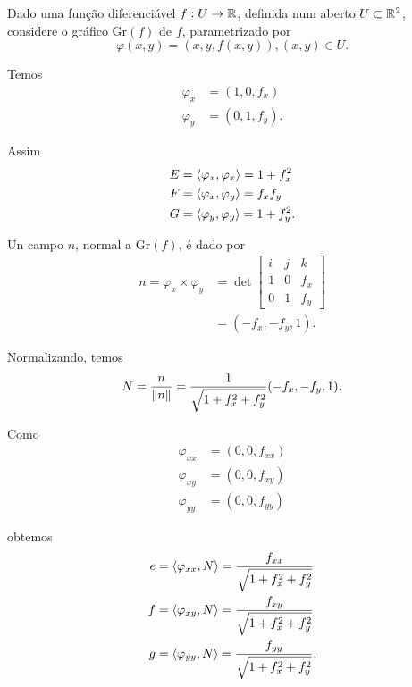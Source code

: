 \begin{exemplo}
	Dado uma função diferenciável $f: U \rightarrow \mathbb{R}$, definida num aberto $U \subset \mathbb{R}^2$, considere o gráfico $\text{Gr}(f)$ de $f$, parametrizado por
	\begin{equation*}
		\varphi(x,y) = (x,y,f(x,y)), (x,y) \in U.
	\end{equation*}
	
	Temos
	\begin{align*}
		\varphi_x &= (1,0,f_x)\\
		\varphi_y &= (0,1,f_y).
	\end{align*}
	
	Assim
	\begin{align*}
		E &= \langle \varphi_x,\varphi_x \rangle = 1 + f_x^2\\
		F &= \langle \varphi_x,\varphi_y \rangle = f_x f_y\\
		G &= \langle \varphi_y,\varphi_y \rangle = 1 + f_y^2.
	\end{align*}
	
	Un campo $n$, normal a $\text{Gr}(f)$, é dado por
	\begin{align*}
		n = \varphi_x \times \varphi_y &= \det \left[ \begin{matrix}
		i & j & k\\
		1 & 0 & f_x\\
		0 & 1 & f_y
		\end{matrix} \right]\\
		&= (-f_x, -f_y, 1).
	\end{align*}
	
	Normalizando, temos
	\begin{equation*}
		N = \frac{n}{\left\| n \right\|} = \frac{1}{\sqrt{1 + f_x^2 + f_y^2}}(-f_x, -f_y, 1).
	\end{equation*}
	
	Como
	\begin{align*}
		\varphi_{xx} &= (0, 0, f_{xx})\\
		\varphi_{xy} &= (0, 0, f_{xy})\\
		\varphi_{yy} &= (0, 0, f_{yy})
	\end{align*}
	
	obtemos
	\begin{align*}
		e &= \langle \varphi_{xx},N \rangle = \frac{f_{xx}}{\sqrt{1 + f_x^2 + f_y^2}}\\
		f &= \langle \varphi_{xy},N \rangle = \frac{f_{xy}}{\sqrt{1 + f_x^2 + f_y^2}}\\
		g &= \langle \varphi_{yy},N \rangle = \frac{f_{yy}}{\sqrt{1 + f_x^2 + f_y^2}}.
	\end{align*}
	

\end{exemplo}
